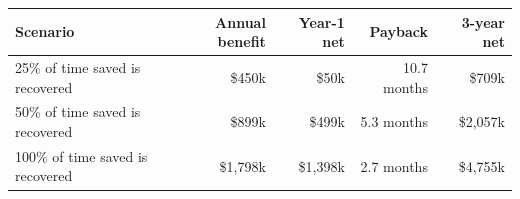 \begin{tabular}{@{}lrrrr@{}}
\toprule
\textbf{Scenario} & \textbf{Annual benefit} & \textbf{Year-1 net} & \textbf{Payback} & \textbf{3-year net} \\
\midrule
25\% of time saved is recovered & \$450k & \$50k & 10.7 months & \$709k \\
50\% of time saved is recovered & \$899k & \$499k & 5.3 months & \$2,057k \\
100\% of time saved is recovered & \$1,798k & \$1,398k & 2.7 months & \$4,755k \\
\bottomrule
\end{tabular}